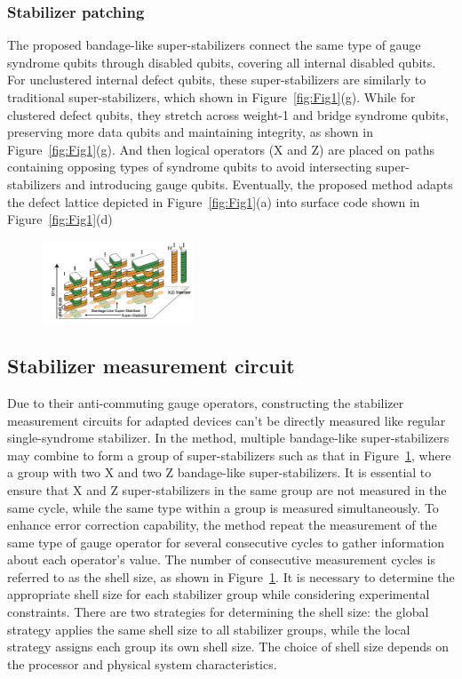 \subsubsection{Stabilizer patching}

The proposed bandage-like super-stabilizers connect the same type of gauge syndrome qubits through disabled qubits, covering all internal disabled qubits. For unclustered internal defect qubits, these super-stabilizers are similarly to traditional super-stabilizers, which shown in Figure~\ref{fig:Fig1}(g). While for clustered defect qubits, they stretch across weight-1 and bridge syndrome qubits, preserving more data qubits and maintaining integrity, as  shown in Figure~\ref{fig:Fig1}(g). And then logical operators (X and Z) are placed on paths containing opposing types of syndrome qubits to avoid intersecting super-stabilizers and introducing gauge qubits. Eventually, the proposed method adapts the defect lattice depicted in Figure~\ref{fig:Fig1}(a) into surface code shown in Figure~\ref{fig:Fig1}(d)

\begin{figure}[h]
    \centering
    \includegraphics[width=0.4\textwidth]{sections/4_stabilizer/Fig2.png}
    \caption{}
    \label{fig:Fig2}
\end{figure}

\subsection{Stabilizer measurement circuit} 

Due to their anti-commuting gauge operators, constructing the stabilizer measurement circuits for adapted devices can't be directly measured like regular single-syndrome stabilizer. In the method, multiple bandage-like super-stabilizers may combine to form a group of super-stabilizers such as that in Figure~\ref{fig:Fig2}, where a group with two X and two Z bandage-like super-stabilizers. It is essential to ensure that X and Z super-stabilizers in the same group are not measured in the same cycle, while the same type within a group is measured simultaneously.
To enhance error correction capability, the method repeat the measurement of the same type of gauge operator for several consecutive cycles to gather information about each operator's value. The number of consecutive measurement cycles is referred to as the shell size, as shown in Figure~\ref{fig:Fig2}. It is necessary to determine the appropriate shell size for each stabilizer group while considering experimental constraints. There are two strategies for determining the shell size: the global strategy applies the same shell size to all stabilizer groups, while the local strategy assigns each group its own shell size. The choice of shell size depends on the processor and physical system characteristics.

